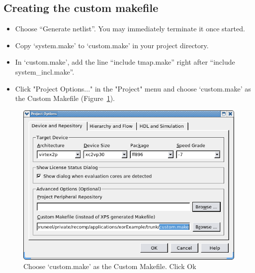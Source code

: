 \documentclass[a4paper,oneside]{memoir}
\begin{document}
\subsection{Creating the custom makefile}
\begin{itemize}
\item Choose  ``Generate netlist''. You may immediately terminate it once started.
\item Copy `system.make' to `custom.make' in your project directory.
\item In `custom.make', add the line ``include tmap.make'' right after ``include system\_incl.make''.
\item Click "Project Options..." in the "Project" menu and choose `custom.make' as the Custom Makefile (Figure~\ref{fig:makefile}).
\end{itemize}
\begin{figure}[H]
\centering
\includegraphics[scale=0.5]{make}
\caption{Choose `custom.make' as the Custom Makefile. Click Ok\label{fig:makefile}}
\end{figure}
\end{document}

